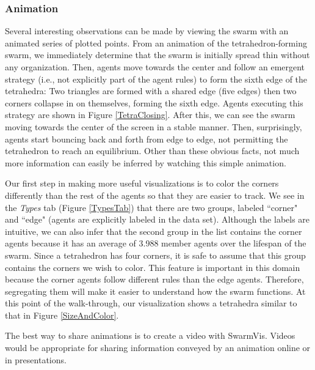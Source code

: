 \documentclass{vgtc}
\begin{document}
\subsubsection{Animation}

Several interesting observations can be made by viewing the swarm with an animated series of plotted points.
From an animation of the tetrahedron-forming swarm,
we immediately determine that the swarm is initially spread thin without any organization.
Then, agents move towards the center and follow an emergent strategy (i.e., not explicitly part of the agent rules)
to form the sixth edge of the tetrahedra: Two triangles are formed with a shared edge (five edges) then two corners collapse in on themselves, forming the sixth edge. Agents executing this strategy are shown in Figure \ref{TetraClosing}.
After this, we can see the swarm moving towards the center of the screen in a stable manner.
Then, surprisingly, agents start bouncing back and forth from edge to edge, not permitting the tetrahedron to
reach an equilibrium. Other than these obvious facts, not much more information can easily be inferred by watching this simple animation.

Our first step in making more useful visualizations is to color the corners differently than the rest of the agents so that
they are easier to track. We see in the \textit{Types} tab (Figure \ref{TypesTab}) that there are two groups, labeled
``corner" and ``edge" (agents are explicitly labeled in the data set). Although the labels are intuitive, we can also infer that the second group in the list contains the corner agents because it has an average of 3.988 member agents over the lifespan of the swarm.
Since a tetrahedron has four corners, it is safe to assume that this group contains the corners we wish to color.
This feature is important in this domain because the corner agents follow different rules than the edge agents.
Therefore, segregating them will make it easier to understand how the swarm functions.
At this point of the walk-through, our visualization shows a tetrahedra similar to that in Figure \ref{SizeAndColor}.

The best way to share animations is to create a video with SwarmVis.
Videos would be appropriate for sharing information conveyed by an animation online or in presentations.
\end{document}
